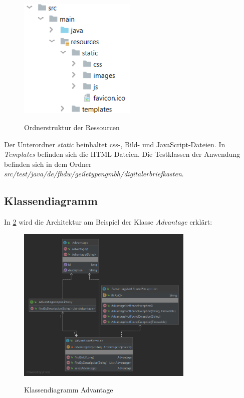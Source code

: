 \begin{figure}[htb]
    \centering
    \begin{minipage}[H]{1\textwidth}
        \caption{Ordnerstruktur der Ressourcen}
        \includegraphics[width=0.5\textwidth]{img/resources-ordner.png}\\
        \label{fig:resources-ordner}
    \end{minipage}
\end{figure}

Der Unterordner \textit{static} beinhaltet css-, Bild- und JavaScript-Dateien. In \textit{Templates} befinden sich die HTML Dateien.
Die Testklassen der Anwendung befinden sich in dem Ordner \textit{src/test/java/de/fhdw/geiletypengmbh/digitalerbriefkasten}.

\subsection{Klassendiagramm}
In \cref{fig:advantage-klassendiagramm} wird die Architektur am Beispiel der Klasse \textit{Advantage} erklärt:

\begin{figure}[htb]
    \centering
    \begin{minipage}[H]{1\textwidth}
        \caption{Klassendiagramm Advantage}
        \includegraphics[width=0.75\textwidth]{img/advantage-klassendiagramm.png}\\
        \label{fig:advantage-klassendiagramm}
    \end{minipage}
\end{figure}

